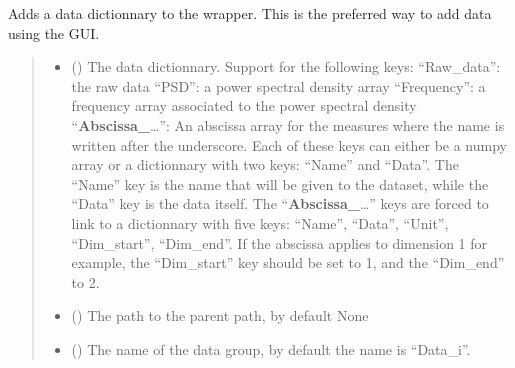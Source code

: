 \documentclass[letterpaper,10pt,english]{sphinxmanual}
\begin{document}
\begin{fulllineitems}
\begin{fulllineitems}
\label{\detokenize{source/HDF5_BLS:HDF5_BLS.wrapper.Wrapper.add_dictionnary}}
\pysigstartsignatures
\pysiglinewithargsret
{}
{\sphinxparamcomma {}\sphinxparamcomma {}\sphinxparamcomma {}\sphinxparamcomma {}}
{}
\pysigstopsignatures
\sphinxAtStartPar
Adds a data dictionnary to the wrapper. This is the preferred way to add data using the GUI.
\begin{quote}\begin{description}
\begin{itemize}
\item {} 
\sphinxAtStartPar
{} () \textendash{} The data dictionnary. Support for the following keys:
\sphinxhyphen{} “Raw\_data”: the raw data
\sphinxhyphen{} “PSD”: a power spectral density array
\sphinxhyphen{} “Frequency”: a frequency array associated to the power spectral density
\sphinxhyphen{} “{\color{red}\bfseries{}Abscissa\_}…”: An abscissa array for the measures where the name is written after the underscore.
Each of these keys can either be a numpy array or a dictionnary with two keys: “Name” and “Data”. The “Name” key is the name that will be given to the dataset, while the “Data” key is the data itself.
The “{\color{red}\bfseries{}Abscissa\_}…” keys are forced to link to a dictionnary with five keys: “Name”, “Data”, “Unit”, “Dim\_start”, “Dim\_end”. If the abscissa applies to dimension 1 for example, the “Dim\_start” key should be set to 1, and the “Dim\_end” to 2.

\item {} 
\sphinxAtStartPar
{} (\sphinxstyleliteralemphasis{\sphinxupquote{, }}) \textendash{} The path to the parent path, by default None

\item {} 
\sphinxAtStartPar
{} (\sphinxstyleliteralemphasis{\sphinxupquote{, }}) \textendash{} The name of the data group, by default the name is “Data\_i”.


\end{itemize}
\end{description}
\end{quote}
\end{fulllineitems}
\end{fulllineitems}
\end{document}
